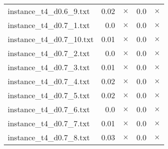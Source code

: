 \documentclass{article}
\begin{document}
\begin{center}
\begin{tabular}{lrrrr}
instance\_t4\_d0.6\_9.txt & 0.02 & 
$\times$
 & 0.0 & 
$\times$
\\
instance\_t4\_d0.7\_1.txt & 0.0 & 
$\times$
 & 0.0 & 
$\times$
\\
instance\_t4\_d0.7\_10.txt & 0.01 & 
$\times$
 & 0.0 & 
$\times$
\\
instance\_t4\_d0.7\_2.txt & 0.0 & 
$\times$
 & 0.0 & 
$\times$
\\
instance\_t4\_d0.7\_3.txt & 0.01 & 
$\times$
 & 0.0 & 
$\times$
\\
instance\_t4\_d0.7\_4.txt & 0.02 & 
$\times$
 & 0.0 & 
$\times$
\\
instance\_t4\_d0.7\_5.txt & 0.02 & 
$\times$
 & 0.0 & 
$\times$
\\
instance\_t4\_d0.7\_6.txt & 0.0 & 
$\times$
 & 0.0 & 
$\times$
\\
instance\_t4\_d0.7\_7.txt & 0.01 & 
$\times$
 & 0.0 & 
$\times$
\\
instance\_t4\_d0.7\_8.txt & 0.03 & 
$\times$
 & 0.0 & 
$\times$
\\
\hline\end{tabular}
\end{center}
\end{document}
